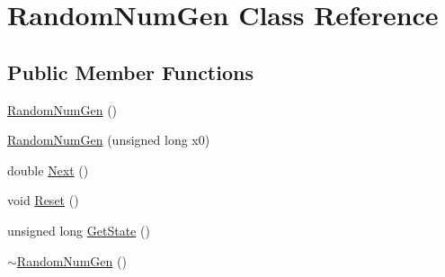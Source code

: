 \hypertarget{class_random_num_gen}{\section{Random\-Num\-Gen Class Reference}
\label{class_random_num_gen}
}
\subsection*{Public Member Functions}
\begin{DoxyCompactItemize}
\item 
\hyperlink{class_random_num_gen_adc07d95ae2d1d3a5a4a395f233e30a2c}{Random\-Num\-Gen} ()
\item 
\hyperlink{class_random_num_gen_ac98ff22efa3b9c23e6b6ba1cf6a6097f}{Random\-Num\-Gen} (unsigned long x0)
\item 
double \hyperlink{class_random_num_gen_a49782fde536ad4b01ab3bd6063a5c6c2}{Next} ()
\item 
void \hyperlink{class_random_num_gen_a12e515fdf02cd66772a76ae0765d4d08}{Reset} ()
\item 
unsigned long \hyperlink{class_random_num_gen_a936200dd149f676875efaa2dbed8699e}{Get\-State} ()
\item 
\hyperlink{class_random_num_gen_a8fec599a61c18b20bfd567ff5b80ab31}{$\sim$\-Random\-Num\-Gen} ()
\end{DoxyCompactItemize}



